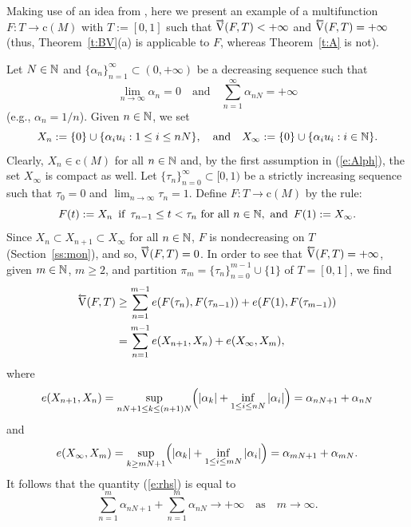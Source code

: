 \documentclass[preprint,12pt]{elsarticle}
\newcommand{\eq}[1]{\mbox{\rm(\ref{#1})}}
\newcommand{\riV}{{\scriptstyle\overrightarrow{\mbox{\rm V}}}}
\newcommand{\leV}{{\scriptstyle\overleftarrow{\mbox{\rm V}}}}
\begin{document}
\begin{exa} \label{ex3}
Making use of an idea from \cite[Example~3.1]{JMAA07}, here we present an example
of a multifunction $F:T\to\mbox{c}(M)$ with $T:=[0,1]$ such that
$\riV(F,T)<+\infty$ and $\leV(F,T)=+\infty$ (thus, Theorem~\ref{t:BV}(a) is
applicable to $F$, whereas Theorem~\ref{t:A} is not).

Let $N\in\mathbb{N}$ and $\{\alpha_n\}_{n=1}^\infty\subset(0,+\infty)$ be a
decreasing sequence such that
  \begin{equation} \label{e:Alph}
\lim_{n\to\infty}\alpha_n=0\quad\mbox{and}\quad
\sum_{n=1}^\infty\alpha_{nN}=+\infty
  \end{equation}
(e.g., $\alpha_n=1/n$). Given $n\in\mathbb{N}$, we set
  \begin{equation*}
X_n:=\{0\}\cup\{\alpha_iu_i:1\le i\le nN\},\quad\mbox{and}\quad
X_\infty:=\{0\}\cup\{\alpha_iu_i:i\in\mathbb{N}\}.
  \end{equation*}
Clearly, $X_n\in\mbox{c}(M)$ for all $n\in\mathbb{N}$ and, by the first assumption in \eq{e:Alph},
the set $X_\infty$ is compact as well. Let $\{\tau_n\}_{n=0}^\infty\subset[0,1)$ be a
strictly increasing sequence such that $\tau_0=0$ and $\lim_{n\to\infty}\tau_n=1$.
Define $F:T\to\mbox{c}(M)$ by the rule:
  \begin{equation*}
\mbox{$F(t):=X_n$ \,if\, $\tau_{n-1}\le t<\tau_n$ for all $n\in\mathbb{N}$, \,and\,
$F(1):=X_\infty$.}
  \end{equation*}
Since $X_n\subset X_{n+1}\subset X_\infty$ for all $n\in\mathbb{N}$, $F$ is nondecreasing
on $T$ (Section~\ref{ss:mon}), and so, $\riV(F,T)=0$. In order to see that
$\leV(F,T)=+\infty$, given $m\in\mathbb{N}$, $m\ge2$, and partition
$\pi_m=\{\tau_n\}_{n=0}^{m-1}\cup\{1\}$ of $T=[0,1]$, we find
  \begin{align}
\leV(F,T)&\ge\sum_{n=1}^{m-1}e(F(\tau_n),F(\tau_{n-1}))+e(F(1),F(\tau_{m-1}))
  \nonumber\\
&=\sum_{n=1}^{m-1}e(X_{n+1},X_n)+e(X_\infty,X_m), \label{e:rhs}
  \end{align}
where
  \begin{equation*}
e(X_{n+1},X_n)=\sup_{nN+1\le k\le(n+1)N}\Bigl(|\alpha_k|+
  \inf_{1\le i\le nN}|\alpha_i|\Bigr)=\alpha_{nN+1}+\alpha_{nN}
  \end{equation*}
and
  \begin{equation*}
e(X_\infty,X_m)=\sup_{k\ge mN+1}\Bigl(|\alpha_k|+
  \inf_{1\le i\le mN}|\alpha_i|\Bigr)=\alpha_{mN+1}+\alpha_{mN}.
  \end{equation*}
It follows that the quantity \eq{e:rhs} is equal to
  \begin{equation*}
\sum_{n=1}^m\alpha_{nN+1}+\sum_{n=1}^m\alpha_{nN}\to+\infty\quad
\mbox{as}\quad m\to\infty.
  \end{equation*}
\end{exa}
\end{document}
